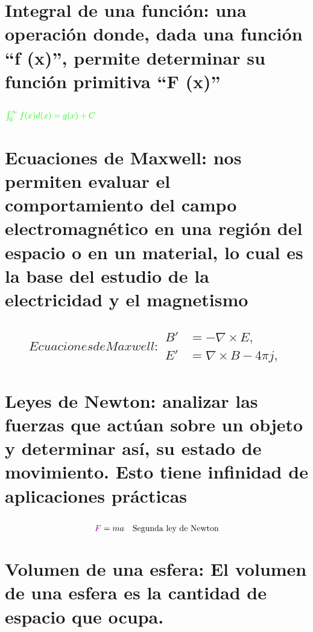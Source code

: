 \documentclass[12pt]{article}
\begin{document}
\section{Integral de una funci\'on: una operación donde, dada una función “f (x)”, permite determinar su función primitiva “F (x)”}

 \subsection{$\textcolor{green}{\int_0^\infty f(x)d(x) = g(x) + C}$}

\section{Ecuaciones de Maxwell:  nos permiten evaluar el comportamiento del campo electromagnético en una región del espacio o en un material, lo cual es la base del estudio de la electricidad y el magnetismo}

 \subsection{\begin{subequations} \label{eq:Maxwell} Ecuaciones de Maxwell: \begin{align} B'&=-\nabla \times E, \label{eq:MaxB} \\ E'&=\nabla \times B - 4\pi j, \label{eq:MaxE} \end{align} \end{subequations}}
 
\section{Leyes de Newton: analizar las fuerzas que actúan sobre un objeto y determinar así, su estado de movimiento. Esto tiene infinidad de aplicaciones prácticas}

\subsection{\begin{equation} \textcolor{violet}
F = ma \quad\text{Segunda ley de Newton}
\end{equation}}

\section{Volumen de una esfera: El volumen de una esfera es la cantidad de espacio que ocupa. }
\end{document}
